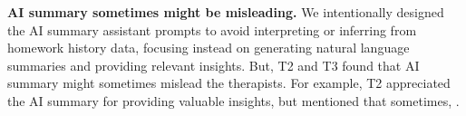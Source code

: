 \textbf{AI summary sometimes might be misleading.} 
We intentionally designed the AI summary assistant prompts to avoid interpreting or inferring from homework history data, focusing instead on generating natural language summaries and providing relevant insights. But, T2 and T3 found that AI summary might sometimes mislead the therapists. For example, T2 appreciated the AI summary for providing valuable insights, but mentioned that sometimes, .

%






        
        
